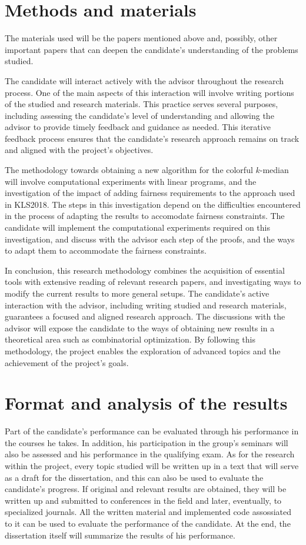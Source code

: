 \documentclass[12pt]{article}
\begin{document}
\section{Methods and materials}
The materials used will be the papers mentioned above and, possibly, other important papers that can deepen the candidate's understanding of the problems studied.

The candidate will interact actively with the advisor throughout the research process. 
One of the main aspects of this interaction will involve writing portions of the studied and research materials. 
This practice serves several purposes, including assessing the candidate's level of understanding and allowing the advisor to provide timely feedback and guidance as needed. 
This iterative feedback process ensures that the candidate’s research approach remains on track and aligned with the project's objectives.

The methodology towards obtaining a new algorithm for the colorful $k$-median will involve computational experiments with linear programs, and the investigation of the impact of adding fairness requirements to the approach used in KLS2018. The steps in this investigation depend on the difficulties encountered in the process of adapting the results to accomodate fairness constraints.  The candidate will implement the computational experiments required on this investigation, and discuss with the advisor each step of the proofs, and the ways to adapt them to accommodate the fairness constraints. 

In conclusion, this research methodology combines the acquisition of essential tools with extensive reading of relevant research papers, and investigating ways to modify the current results to more general setups. 
The candidate's active interaction with the advisor, including writing studied and research materials, 
guarantees a focused and aligned research approach.  The discussions with the advisor will expose the 
candidate to the ways of obtaining new results in a theoretical area such as combinatorial optimization.
By following this methodology, the project enables the exploration of advanced topics and 
the achievement of the project's goals.

\section{Format and analysis of the results}

Part of the candidate's performance can be evaluated through his performance in the courses he takes. 
In addition, his participation in the group's seminars will also be assessed and his performance in 
the qualifying exam. 
As for the research within the project, every topic studied will be written up in a text that will 
serve as a draft for the dissertation, and this can also be used to evaluate the candidate's progress. 
If original and relevant results are obtained, 
they will be written up and submitted to conferences in the field and later, eventually, to specialized journals.
All the written material and implemented code assossiated to it can be used to evaluate the 
performance of the candidate.  At the end, the dissertation itself will summarize the results 
of his performance. 
\end{document}
